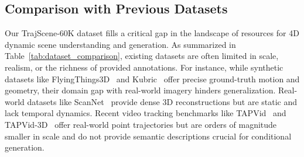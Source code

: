 \begin{table}[t]
\centering
\caption{\textbf{Comprehensive comparison of 3D scene understanding datasets.} Our TrajScene-60K dataset significantly surpasses existing benchmarks in scale, providing orders of magnitude more frames and 3D point annotations, while offering dense tracking and depth information across diverse real-world indoor and outdoor environments.}
\vspace{-3mm}
\vspace{-5mm}
\label{tab:dataset_comparison}
\end{table}

\subsection{Comparison with Previous Datasets}

Our TrajScene-60K dataset fills a critical gap in the landscape of resources for 4D dynamic scene understanding and generation. As summarized in Table~\ref{tab:dataset_comparison}, existing datasets are often limited in scale, realism, or the richness of provided annotations. For instance, while synthetic datasets like FlyingThings3D~\cite{flyingthing3D} and Kubric~\cite{greff2022kubric} offer precise ground-truth motion and geometry, their domain gap with real-world imagery hinders generalization. Real-world datasets like ScanNet~\cite{scannet} provide dense 3D reconstructions but are static and lack temporal dynamics. Recent video tracking benchmarks like TAPVid~\cite{tapvid} and TAPVid-3D~\cite{tapvid3d} offer real-world point trajectories but are orders of magnitude smaller in scale and do not provide semantic descriptions crucial for conditional generation.

